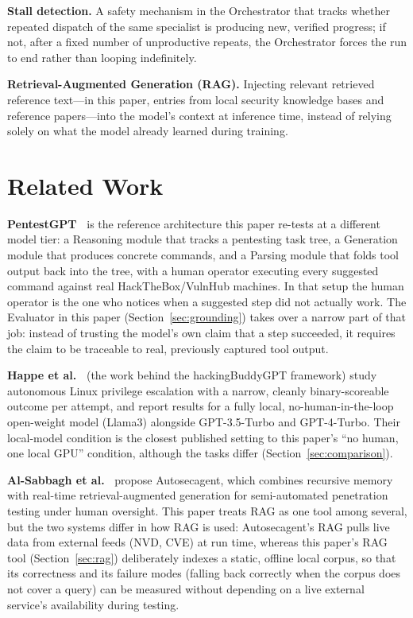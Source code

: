 \documentclass[conference]{IEEEtran}
\begin{document}
\textbf{Stall detection.} A safety mechanism in the Orchestrator that
tracks whether repeated dispatch of the same specialist is producing new,
verified progress; if not, after a fixed number of unproductive repeats, the
Orchestrator forces the run to end rather than looping indefinitely.

\textbf{Retrieval-Augmented Generation (RAG).} Injecting relevant retrieved
reference text---in this paper, entries from local security knowledge
bases and reference papers---into the model's context at inference time,
instead of relying solely on what the model already learned during
training.

\section{Related Work}
\label{sec:related}

\textbf{PentestGPT~\cite{pentestgpt}} is the reference architecture this
paper re-tests at a different model tier: a Reasoning module that tracks a
pentesting task tree, a Generation module that produces concrete commands,
and a Parsing module that folds tool output back into the tree, with a
human operator executing every suggested command against real
HackTheBox/VulnHub machines. In that setup the human operator is the one
who notices when a suggested step did not actually work. The Evaluator in
this paper (Section~\ref{sec:grounding}) takes over a narrow part of that
job: instead of trusting the model's own claim that a step succeeded, it
requires the claim to be traceable to real, previously captured tool
output.

\textbf{Happe et al.~\cite{happe2026}} (the work behind the hackingBuddyGPT
framework) study autonomous Linux privilege escalation with a narrow,
cleanly binary-scoreable outcome per attempt, and report results for a
fully local, no-human-in-the-loop open-weight model (Llama3) alongside
GPT-3.5-Turbo and GPT-4-Turbo. Their local-model condition is the closest
published setting to this paper's ``no human, one local GPU'' condition,
although the tasks differ (Section~\ref{sec:comparison}).

\textbf{Al-Sabbagh et al.~\cite{alsabbagh2026}} propose Autosecagent, which
combines recursive memory with real-time retrieval-augmented generation for
semi-automated penetration testing under human oversight. This paper treats
RAG as one tool among several, but the two
systems differ in how RAG is used: Autosecagent's RAG pulls live data from
external feeds (NVD, CVE) at run time, whereas this paper's RAG tool
(Section~\ref{sec:rag}) deliberately indexes a static, offline local corpus,
so that its correctness and its failure modes (falling back correctly when
the corpus does not cover a query) can be measured without depending on a
live external service's availability during testing.
\end{document}

